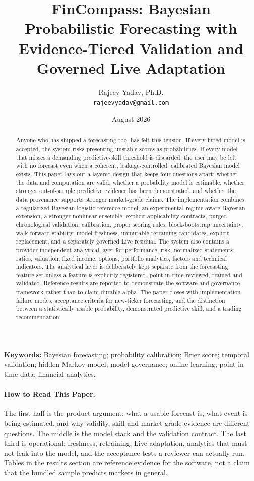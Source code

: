 \documentclass[11pt]{article}
\title{\textbf{FinCompass: Bayesian Probabilistic Forecasting with Evidence-Tiered Validation and Governed Live Adaptation}}
\author{Rajeev Yadav, Ph.D.\\\texttt{rajeevyadav@gmail.com}}
\date{August 2026}
\begin{document}
\maketitle

\begin{abstract}
Anyone who has shipped a forecasting tool has felt this tension. If every fitted model is accepted, the system risks presenting unstable scores as probabilities. If every model that misses a demanding predictive-skill threshold is discarded, the user may be left with no forecast even when a coherent, leakage-controlled, calibrated Bayesian model exists. This paper lays out a layered design that keeps four questions apart: whether the data and computation are valid, whether a probability model is estimable, whether stronger out-of-sample predictive evidence has been demonstrated, and whether the data provenance supports stronger market-grade claims. The implementation combines a regularized Bayesian logistic reference model, an experimental regime-aware Bayesian extension, a stronger nonlinear ensemble, explicit applicability contracts, purged chronological validation, calibration, proper scoring rules, block-bootstrap uncertainty, walk-forward stability, model freshness, immutable retraining candidates, explicit replacement, and a separately governed Live residual. The system also contains a provider-independent analytical layer for performance, risk, normalized statements, ratios, valuation, fixed income, options, portfolio analytics, factors and technical indicators. The analytical layer is deliberately kept separate from the forecasting feature set unless a feature is explicitly registered, point-in-time reviewed, trained and validated. Reference results are reported to demonstrate the software and governance framework rather than to claim durable alpha. The paper closes with implementation failure modes, acceptance criteria for new-ticker forecasting, and the distinction between a statistically usable probability, demonstrated predictive skill, and a trading recommendation.
\end{abstract}

\noindent\textbf{Keywords:} Bayesian forecasting; probability calibration; Brier score; temporal validation; hidden Markov model; model governance; online learning; point-in-time data; financial analytics.

\paragraph{How to Read This Paper.}
The first half is the product argument: what a usable forecast is, what event is being estimated, and why validity, skill and market-grade evidence are different questions. The middle is the model stack and the validation contract. The last third is operational: freshness, retraining, Live adaptation, analytics that must not leak into the model, and the acceptance tests a reviewer can actually run. Tables in the results section are reference evidence for the software, not a claim that the bundled sample predicts markets in general.
\end{document}
